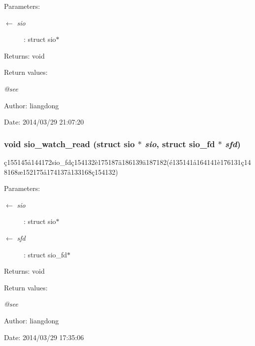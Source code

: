 \begin{Desc}
\item[Parameters:]
\begin{description}
\item[\mbox{$\leftarrow$} {\em sio}]: struct sio$\ast$ \end{description}
\end{Desc}
\begin{Desc}
\item[Returns:]void \end{Desc}
\begin{Desc}
\item[Return values:]
\begin{description}
\item[{\em @see}]\end{description}
\end{Desc}
\begin{Desc}
\item[Author:]liangdong \end{Desc}
\begin{Desc}
\item[Date:]2014/03/29 21:07:20 \end{Desc}
\subsubsection{\setlength{\rightskip}{0pt plus 5cm}void sio\_\-watch\_\-read (struct sio $\ast$ {\em sio}, struct sio\_\-fd $\ast$ {\em sfd})}\label{sio_8c_a9}


\c{c}155145\aa{}144172sio\_\-fd\c{c}154132\`{e}175187\"{a}186139\"{a}187182(\'{e}135141\aa{}164141\`{e}176131\c{c}148168\ae{}152175\aa{}174137\aa{}133168\c{c}154132) 

\begin{Desc}
\item[Parameters:]
\begin{description}
\item[\mbox{$\leftarrow$} {\em sio}]: struct sio$\ast$ \item[\mbox{$\leftarrow$} {\em sfd}]: struct sio\_\-fd$\ast$ \end{description}
\end{Desc}
\begin{Desc}
\item[Returns:]void \end{Desc}
\begin{Desc}
\item[Return values:]
\begin{description}
\item[{\em @see}]\end{description}
\end{Desc}
\begin{Desc}
\item[Author:]liangdong \end{Desc}
\begin{Desc}
\item[Date:]2014/03/29 17:35:06 \end{Desc}

